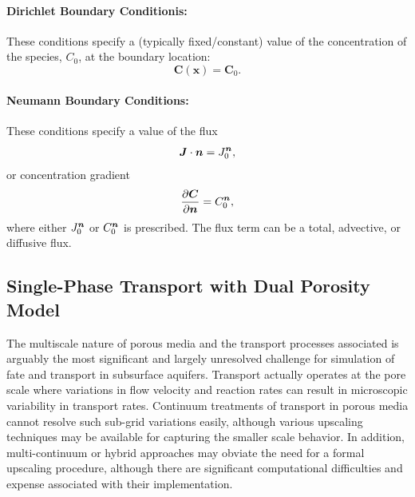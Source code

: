 \paragraph{Dirichlet Boundary Conditionis:}  
These conditions specify a (typically fixed/constant) value of the concentration of the species, $C_0$, 
at the boundary location:
\begin{equation}\label{eq:transport Dirichlet}
  \boldsymbol{C}(\boldsymbol{x})=\boldsymbol{C}_{0} .
\end{equation}

\paragraph{Neumann Boundary Conditions:}  
These conditions specify a value of the flux
\begin{equation}\label{eq:transport Neuman flux} 
  \boldsymbol{J}\cdot \boldsymbol{n} = J_0^{\boldsymbol{n}},
\end{equation}
or concentration gradient
\begin{equation}\label{eq:transport Neuman gradient}
  \frac{\partial \boldsymbol{C}}{\partial \boldsymbol{n}} = C_0^{\boldsymbol{n}},
\end{equation}
where either $J_0^{\boldsymbol{n}}$ or $C_0^{\boldsymbol{n}}$ is prescribed. 
The flux term can be a total, advective, or diffusive flux.



\clearpage


\subsection{Single-Phase Transport with Dual Porosity Model} 
\label{sec:transport-single-phase-dual-porosity}

The multiscale nature of porous media and the transport processes associated is 
arguably the most significant and largely unresolved challenge for simulation of 
fate and transport in subsurface aquifers.  
Transport actually operates at the pore scale where variations in flow velocity 
and reaction rates can result in microscopic variability in transport rates.  
Continuum treatments of transport in porous media cannot resolve such sub-grid 
variations easily, although various upscaling techniques may be available for 
capturing the smaller scale behavior.  
In addition, multi-continuum or hybrid approaches may obviate the need for a formal 
upscaling procedure, although there are significant computational difficulties and 
expense associated with their implementation.


